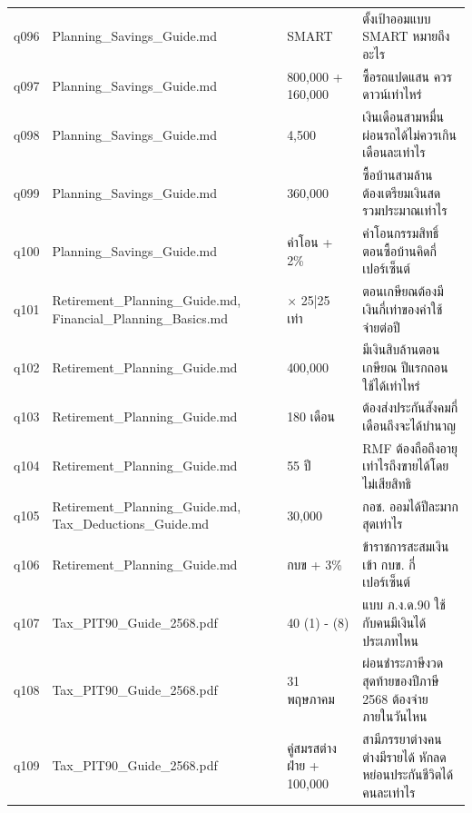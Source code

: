 \documentclass[11pt,a4paper]{article}
\begin{document}
{\begin{longtable}{lp{3.6cm}p{3.4cm}p{6.3cm}}
q096 & Planning\_\allowbreak{}Savings\_\allowbreak{}Guide.md & SMART & {\thaifont ตั้งเป้าออมแบบ }SMART {\thaifont หมายถึงอะไร} \\
q097 & Planning\_\allowbreak{}Savings\_\allowbreak{}Guide.md & 800,000 + 160,000 & {\thaifont ซื้อรถแปดแสน ควรดาวน์เท่าไหร่} \\
q098 & Planning\_\allowbreak{}Savings\_\allowbreak{}Guide.md & 4,500 & {\thaifont เงินเดือนสามหมื่น ผ่อนรถได้ไม่ควรเกินเดือนละเท่าไร} \\
q099 & Planning\_\allowbreak{}Savings\_\allowbreak{}Guide.md & 360,000 & {\thaifont ซื้อบ้านสามล้าน ต้องเตรียมเงินสดรวมประมาณเท่าไร} \\
q100 & Planning\_\allowbreak{}Savings\_\allowbreak{}Guide.md & {\thaifont ค่าโอน }+ 2\% & {\thaifont ค่าโอนกรรมสิทธิ์ตอนซื้อบ้านคิดกี่เปอร์เซ็นต์} \\
q101 & Retirement\_\allowbreak{}Planning\_\allowbreak{}Guide.md, Financial\_\allowbreak{}Planning\_\allowbreak{}Basics.md & $\times$ 25|25 {\thaifont เท่า} & {\thaifont ตอนเกษียณต้องมีเงินกี่เท่าของค่าใช้จ่ายต่อปี} \\
q102 & Retirement\_\allowbreak{}Planning\_\allowbreak{}Guide.md & 400,000 & {\thaifont มีเงินสิบล้านตอนเกษียณ ปีแรกถอนใช้ได้เท่าไหร่} \\
q103 & Retirement\_\allowbreak{}Planning\_\allowbreak{}Guide.md & 180 {\thaifont เดือน} & {\thaifont ต้องส่งประกันสังคมกี่เดือนถึงจะได้บำนาญ} \\
q104 & Retirement\_\allowbreak{}Planning\_\allowbreak{}Guide.md & 55 {\thaifont ปี} & RMF {\thaifont ต้องถือถึงอายุเท่าไรถึงขายได้โดยไม่เสียสิทธิ} \\
q105 & Retirement\_\allowbreak{}Planning\_\allowbreak{}Guide.md, Tax\_\allowbreak{}Deductions\_\allowbreak{}Guide.md & 30,000 & {\thaifont กอช}. {\thaifont ออมได้ปีละมากสุดเท่าไร} \\
q106 & Retirement\_\allowbreak{}Planning\_\allowbreak{}Guide.md & {\thaifont กบข }+ 3\% & {\thaifont ข้าราชการสะสมเงินเข้า กบข}. {\thaifont กี่เปอร์เซ็นต์} \\
q107 & Tax\_\allowbreak{}PIT90\_\allowbreak{}Guide\_\allowbreak{}2568.pdf & 40 (1) - (8) & {\thaifont แบบ ภ}.{\thaifont ง}.{\thaifont ด}.90 {\thaifont ใช้กับคนมีเงินได้ประเภทไหน} \\
q108 & Tax\_\allowbreak{}PIT90\_\allowbreak{}Guide\_\allowbreak{}2568.pdf & 31 {\thaifont พฤษภาคม} & {\thaifont ผ่อนชำระภาษีงวดสุดท้ายของปีภาษี }2568 {\thaifont ต้องจ่ายภายในวันไหน} \\
q109 & Tax\_\allowbreak{}PIT90\_\allowbreak{}Guide\_\allowbreak{}2568.pdf & {\thaifont คู่สมรสต่างฝ่าย }+ 100,000 & {\thaifont สามีภรรยาต่างคนต่างมีรายได้ หักลดหย่อนประกันชีวิตได้คนละเท่าไร} \\

\end{longtable}}
\end{document}
